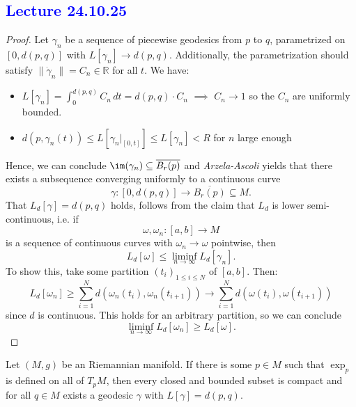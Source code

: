 \subsection{\textcolor{blue}{Lecture 24.10.25}}
\begin{proof}
    Let $\gamma_n$ be a sequence of piecewise geodesics from $p$ to $q$, parametrized on $[0,d(p,q)]$ with $L[\gamma_n] \to d(p,q)$. Additionally, the parametrization should satisfy $\|\dot{\gamma}_n\|=C_n \in \mathbb{R}$ for all $t$. We have:
    \begin{itemize}
        \item $L[\gamma_n]=\int_0^{d(p,q)}C_n \, dt = d(p,q) \cdot C_n$ $\implies$ $C_n \to 1$ so the $C_n$ are uniformly bounded.
        \item $d(p,\gamma_n(t)) \leq L[\gamma_n|_{[0,t]}] \leq L[\gamma_n] < R$ for $n$ large enough
    \end{itemize}
    Hence, we can conclude $\im(\gamma_n) \subseteq \overline{B_r(p)}$ and \emph{Arzela-Ascoli} yields that there exists a subsequence converging uniformly to a continuous curve \[
        \gamma: [0, d(p,q)] \to \overline{B_r(p)}  \subseteq M
    .\] That $L_d[\gamma]=d(p,q)$ holds, follows from the claim that $L_d$ is lower semi-continuous, i.e. if \[
    \omega, \omega_n: [a,b] \to M
    \] is a sequence of continuous curves with $\omega_n \to \omega$ pointwise, then \[
    L_d[\omega] \leq \liminf_{n \to \infty} L_d[\gamma_n]
.\] To show this, take some partition $(t_i)_{1 \leq i \leq N}$ of $[a,b]$. Then:  \[
L_d[\omega_n] \geq \sum_{i=1}^N d(\omega_n(t_i),\omega_{n}(t_{i+1}))\to \sum_{i=1}^N d(\omega(t_i), \omega(t_{i+1}))
\] since $d$ is continuous. This holds for an arbitrary partition, so we can conclude \[
\liminf_{n \to \infty} L_d[\omega_n] \geq L_d[\omega]
.\] 
\end{proof} 
\begin{lemma}
Let $(M,g)$ be an Riemannian manifold. If there is some $p\in M$ such that $\exp_p$ is defined on all of $T_pM$, then every closed and bounded subset is compact and for all $q \in M$ exists a geodesic $\gamma$ with $L[\gamma]=d(p,q)$. 
\end{lemma}
